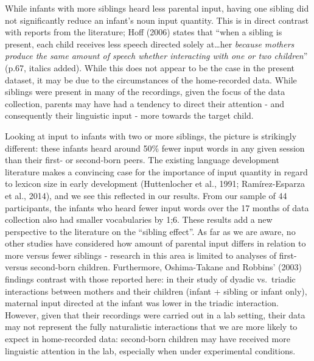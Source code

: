 \documentclass[
  english,
  man,floatsintext]{apa6}
\begin{document}
While infants with more siblings heard less parental input, having one sibling did not significantly reduce an infant's noun input quantity. This is in direct contrast with reports from the literature; Hoff (2006) states that \enquote{when a sibling is present, each child receives less speech directed solely at\ldots her \emph{because mothers produce the same amount of speech whether interacting with one or two children}} (p.67, italics added). While this does not appear to be the case in the present dataset, it may be due to the circumstances of the home-recorded data. While siblings were present in many of the recordings, given the focus of the data collection, parents may have had a tendency to direct their attention - and consequently their linguistic input - more towards the target child.

Looking at input to infants with two or more siblings, the picture is strikingly different: these infants heard around 50\% fewer input words in any given session than their first- or second-born peers. The existing language development literature makes a convincing case for the importance of input quantity in regard to lexicon size in early development (Huttenlocher et al., 1991; Ramírez-Esparza et al., 2014), and we see this reflected in our results. From our sample of 44 participants, the infants who heard fewer input words over the 17 months of data collection also had smaller vocabularies by 1;6. These results add a new perspective to the literature on the \enquote{sibling effect}. As far as we are aware, no other studies have considered how amount of parental input differs in relation to more versus fewer siblings - research in this area is limited to analyses of first- versus second-born children. Furthermore, Oshima-Takane and Robbins' (2003) findings contrast with those reported here: in their study of dyadic vs.~triadic interactions between mothers and their children (infant + sibling or infant only), maternal input directed at the infant was lower in the triadic interaction. However, given that their recordings were carried out in a lab setting, their data may not represent the fully naturalistic interactions that we are more likely to expect in home-recorded data: second-born children may have received more linguistic attention in the lab, especially when under experimental conditions.
\end{document}
